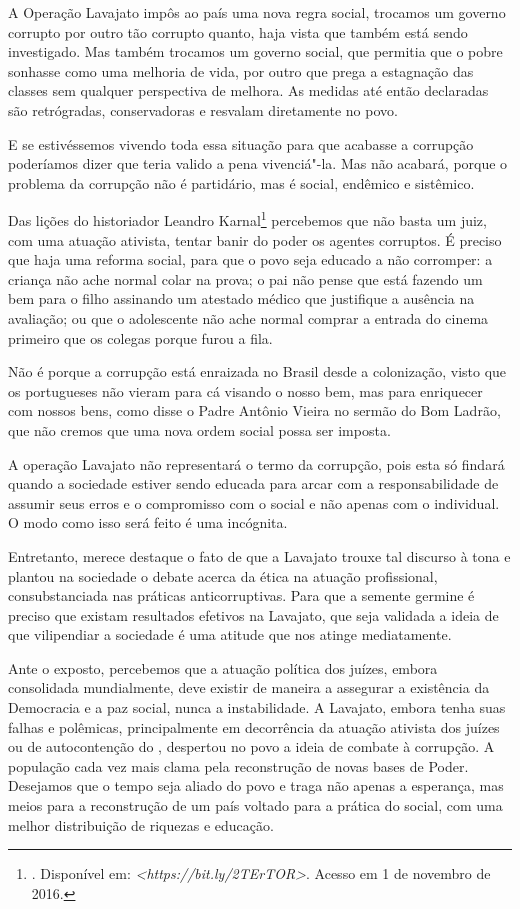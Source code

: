 A Operação Lavajato impôs ao país uma nova regra social, trocamos um
governo corrupto por outro tão corrupto quanto, haja vista que também
está sendo investigado. Mas também trocamos um governo social, que
permitia que o pobre sonhasse como uma melhoria de vida, por outro que
prega a estagnação das classes sem qualquer perspectiva de melhora. As
medidas até então declaradas são retrógradas, conservadoras e resvalam
diretamente no povo.

E se estivéssemos vivendo toda essa situação para que acabasse a
corrupção poderíamos dizer que teria valido a pena vivenciá"-la.
Mas não acabará, porque o problema da corrupção não é partidário,
mas é social, endêmico e sistêmico.

Das lições do historiador Leandro Karnal\footnote{. Disponível em:
  \emph{\textless{}https://bit.ly/2TErTOR\textgreater{}}.
  Acesso em 1 de novembro de 2016.} percebemos que não basta um juiz,
com uma atuação ativista, tentar banir do poder os agentes corruptos. É
preciso que haja uma reforma social, para que o povo seja educado a não
corromper: a criança não ache normal colar na prova; o pai não pense que
está fazendo um bem para o filho assinando um atestado médico que
justifique a ausência na avaliação; ou que o adolescente não ache normal
comprar a entrada do cinema primeiro que os colegas porque furou a fila.

Não é porque a corrupção está enraizada no Brasil desde a colonização,
visto que os portugueses não vieram para cá visando o nosso bem, mas
para enriquecer com nossos bens, como disse o Padre Antônio Vieira no
sermão do Bom Ladrão, que não cremos que uma nova ordem social possa ser
imposta.

A operação Lavajato não representará o termo da corrupção, pois esta só
findará quando a sociedade estiver sendo educada para arcar com a
responsabilidade de assumir seus erros e o compromisso com o social e
não apenas com o individual. O modo como isso será feito é uma
incógnita.

Entretanto, merece destaque o fato de que a Lavajato trouxe tal discurso
à tona e plantou na sociedade o debate acerca da ética na atuação
profissional, consubstanciada nas práticas anticorruptivas. Para que a
semente germine é preciso que existam resultados efetivos na Lavajato,
que seja validada a ideia de que vilipendiar a sociedade é uma atitude
que nos atinge mediatamente.

Ante o exposto, percebemos que a atuação política dos juízes, embora
consolidada mundialmente, deve existir de maneira a assegurar a
existência da Democracia e a paz social, nunca a instabilidade. A
Lavajato, embora tenha suas falhas e polêmicas, principalmente em
decorrência da atuação ativista dos juízes ou de autocontenção do ,
despertou no povo a ideia de combate à corrupção. A população cada vez
mais clama pela reconstrução de novas bases de Poder. Desejamos que o
tempo seja aliado do povo e traga não apenas a esperança, mas meios para
a reconstrução de um país voltado para a prática do social, com uma
melhor distribuição de riquezas e educação.

